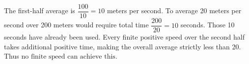 The first-half average is $\dfrac{100}{10}=10$ meters per second. To average 20 meters per second over 200 meters would require total time $\dfrac{200}{20}=10$ seconds. Those 10 seconds have already been used. Every finite positive speed over the second half takes additional positive time, making the overall average strictly less than 20. Thus $\boxed{\text{no finite speed can achieve this}}$.
